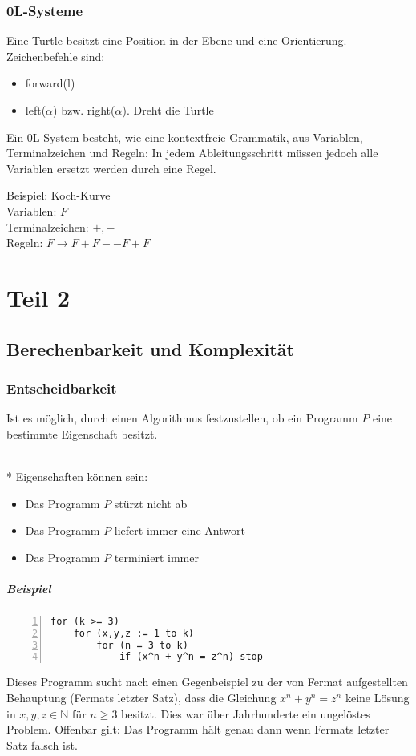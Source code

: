 \documentclass[a4paper]{scrartcl}
\begin{document}
\subsubsection{0L-Systeme}
Eine Turtle besitzt eine Position in der Ebene und eine Orientierung. Zeichenbefehle sind:
\begin{itemize}
\item forward(l)
\item left($\alpha$) bzw. right($\alpha$). Dreht die Turtle
\end{itemize}
Ein 0L-System besteht, wie eine kontextfreie Grammatik, aus Variablen, Terminalzeichen und Regeln: In jedem Ableitungsschritt müssen jedoch alle Variablen ersetzt werden durch eine Regel.

Beispiel: Koch-Kurve\\
Variablen: $F$\\
Terminalzeichen: $+,-$\\
Regeln: $F \rightarrow F + F -- F +F$

\section{Teil 2}
\subsection{Berechenbarkeit und Komplexität}
\subsubsection{Entscheidbarkeit}
Ist es möglich, durch einen Algorithmus festzustellen, ob ein Programm $P$ eine bestimmte Eigenschaft besitzt.\\
\\*
Eigenschaften können sein:
\begin{itemize}
\item Das Programm $P$ stürzt nicht ab
\item Das Programm $P$ liefert immer eine Antwort
\item Das Programm $P$ terminiert immer
\end{itemize}
\subparagraph{Beispiel}
\begin{lstlisting}[numbers=left, tabsize=4, style=customc,mathescape]
for (k >= 3)
    for (x,y,z := 1 to k)
        for (n = 3 to k)
            if (x^n + y^n = z^n) stop
\end{lstlisting}
Dieses Programm sucht nach einen Gegenbeispiel zu der von Fermat aufgestellten Behauptung (Fermats letzter Satz), dass die Gleichung $x^n + y^n = z^n$ keine Lösung in $x,y,z \in \mathbb{N}$ für $n \geq 3$ besitzt. Dies war über Jahrhunderte ein ungelöstes Problem. Offenbar gilt: Das Programm hält genau dann wenn Fermats letzter Satz falsch ist.
\end{document}
